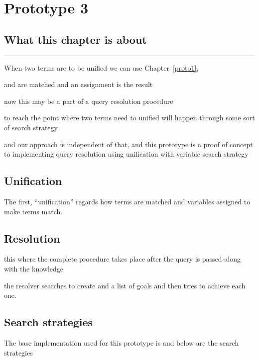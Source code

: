 \documentclass[thesis-solanki.tex]{files}
\begin{document}
\chapter{Prototype 3}{\label{proto3}}


\section{What this chapter is about}

\noindent\rule{\textwidth}{0.5pt}

When two terms are to be unified we can use Chapter~\ref{proto1},

 and  are matched and an assignment is the result 

now this may be a part of a query resolution procedure

to reach the point where two terms need to unified will happen through some sort of search strategy

and our approach is independent of that, and this prototype is a proof of concept to implementing query resolution using unification with
variable search strategy


\section{Unification}
The first, ``unification'' regards how terms are matched and variables assigned to make terms
match.
\cite{website:prologunification}



\section{Resolution}
this where the complete procedure takes place after the query is passed along with the knowledge 

the resolver searches to create and a list of  goals and then tries to achieve each one.

\cite{website:prologresolution}

\cite{website:resolutionlogicwiki}




\section{Search strategies}
The base implementation used for this prototype  is \cite{website:mini-prolog-hugs98} and below are the search
strategies
\end{document}
